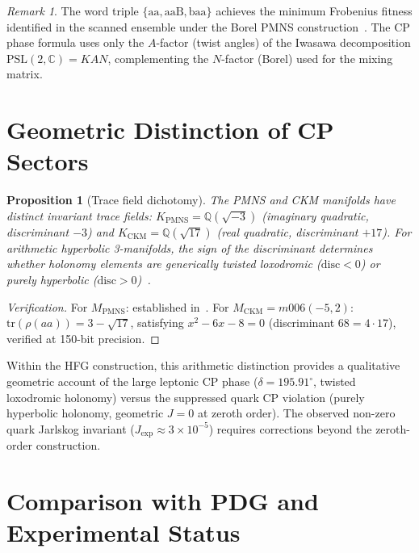 \documentclass[11pt,a4paper]{article}
\newtheorem{proposition}[theorem]{Proposition}
\theoremstyle{definition}
\theoremstyle{remark}
\newtheorem{remark}[theorem]{Remark}
\newcommand{\MPMNS}{M_{\mathrm{PMNS}}}
\newcommand{\KPMNS}{K_{\mathrm{PMNS}}}
\newcommand{\PSL}{\mathrm{PSL}(2,\mathbb{C})}
\newcommand{\QQ}{\mathbb{Q}}
\begin{document}
\begin{remark}
The word triple $\{\mathrm{aa},\mathrm{aaB},\mathrm{baa}\}$
achieves the minimum Frobenius fitness identified in the scanned
ensemble under the Borel PMNS construction~\cite{Gentry:PMNS}.
The CP phase formula uses only the $A$-factor (twist angles)
of the Iwasawa decomposition $\PSL=KAN$, complementing the
$N$-factor (Borel) used for the mixing matrix.
\end{remark}

\section{Geometric Distinction of CP Sectors}
\label{sec:asymmetry}

\begin{proposition}[Trace field dichotomy]
\label{prop:dichotomy}
The PMNS and CKM manifolds have distinct invariant trace fields:
$\KPMNS=\QQ(\sqrt{-3})$ (imaginary quadratic, discriminant $-3$)
and $K_{\mathrm{CKM}}=\QQ(\sqrt{17})$
(real quadratic, discriminant $+17$).
For arithmetic hyperbolic 3-manifolds, the sign of the discriminant
determines whether holonomy elements are generically twisted
loxodromic ($\mathrm{disc}<0$) or purely hyperbolic
($\mathrm{disc}>0$)~\cite{MaclachlanReid}.
\end{proposition}

\begin{proof}[Verification]
For $\MPMNS$: established in~\cite{Chinburg98}.
For $M_{\mathrm{CKM}}=m006(-5,2)$:
$\mathrm{tr}(\rho(aa))=3-\sqrt{17}$,
satisfying $x^2-6x-8=0$ (discriminant $68=4\cdot17$),
verified at 150-bit precision.
\end{proof}

Within the HFG construction, this arithmetic distinction provides
a qualitative geometric account of the large leptonic CP phase
($\delta=195.91^\circ$, twisted loxodromic holonomy) versus the
suppressed quark CP violation (purely hyperbolic holonomy,
geometric $J=0$ at zeroth order).
The observed non-zero quark Jarlskog invariant
($J_\mathrm{exp}\approx3\times10^{-5}$) requires corrections
beyond the zeroth-order construction.

\section{Comparison with PDG and Experimental Status}
\label{sec:comparison}
\end{document}
